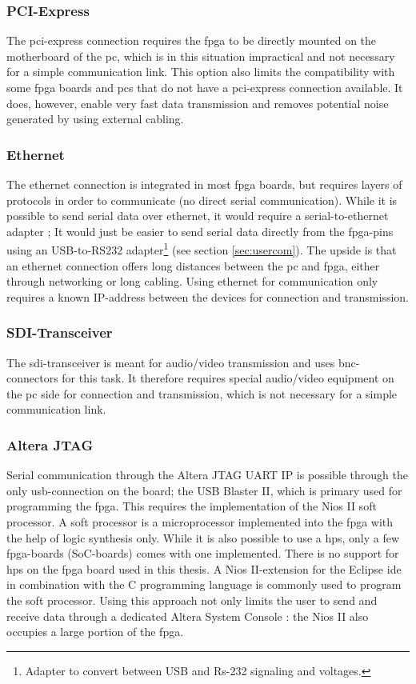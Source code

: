 \documentclass[main.tex]{subfiles}
\begin{document}
\subsubsection{PCI-Express}
The \gls{pci}-express connection requires the \gls{fpga} to be directly mounted on the motherboard of the \acrshort{pc}, which is in this situation impractical and not necessary for a simple communication link. This option also limits the compatibility with some \gls{fpga} boards and \acrshort{pc}s that do not have a \gls{pci}-express connection available. It does, however, enable very fast data transmission and removes potential noise generated by using external cabling. 

\subsubsection{Ethernet}
The ethernet connection is integrated in most \gls{fpga} boards, but requires layers of protocols in order to communicate (no direct serial communication). While it is possible to send serial data over ethernet, it would require a serial-to-ethernet adapter \cite{serial2ethernet}; It would just be easier to send serial data directly from the \gls{fpga}-pins using an USB-to-RS232 adapter\footnote{Adapter to convert between USB and Rs-232 signaling and voltages.} (see section \ref{sec:usercom}). The upside is that an ethernet connection offers long distances between the \acrshort{pc} and \gls{fpga}, either through networking or long cabling. Using ethernet for communication only requires a known IP-address between the devices for connection and transmission.

\subsubsection{SDI-Transceiver}
The \acrshort{sdi}-transceiver is meant for audio/video transmission and uses \acrshort{bnc}-connectors for this task. It therefore requires special audio/video equipment on the \acrshort{pc} side for connection and transmission, which is not necessary for a simple communication link.

\subsubsection{Altera JTAG}
Serial communication through the Altera JTAG UART IP is possible through the only \acrshort{usb}-connection on the board; the USB Blaster II, which is primary used for programming the \gls{fpga}. This requires the implementation of the Nios II soft processor. A soft processor is a microprocessor implemented into the \gls{fpga} with the help of logic synthesis only. While it is also possible to use a \gls{hps}, only a few \gls{fpga}-boards (SoC-boards) comes with one implemented. There is no support for \gls{hps} on the \gls{fpga} board used in this thesis. A Nios II-extension for the Eclipse \acrshort{ide} in combination with the C programming language is commonly used to program the soft processor. Using this approach not only limits the user to send and receive data through a dedicated Altera System Console \cite{altera_terminals14}: the Nios II also occupies a large portion of the \gls{fpga}.
\end{document}
